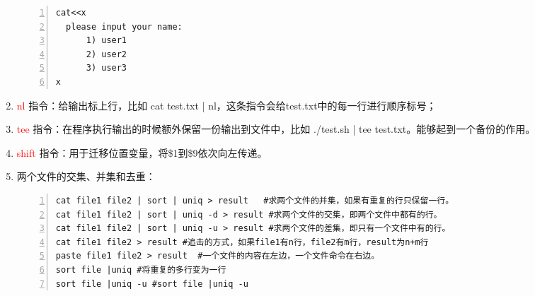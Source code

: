 \begin{enumerate}
    \begin{lstlisting}[language = shell, numbers=left, 
         numberstyle=\tiny,keywordstyle=\color{blue!70},
         commentstyle=\color{red!50!green!50!blue!50},frame=shadowbox,
         rulesepcolor=\color{red!20!green!20!blue!20},basicstyle=\ttfamily]
cat<<x
  please input your name:
      1) user1
      2) user2
      3) user3
x
    \end{lstlisting}
  \item \textcolor{red}{nl} 指令：给输出标上行，比如 cat test.txt | nl，这条指令会给test.txt中的每一行进行顺序标号；
  \item \textcolor{red}{tee} 指令：在程序执行输出的时候额外保留一份输出到文件中，比如 ./test.sh | tee test.txt。能够起到一个备份的作用。
  \item \textcolor{red}{shift} 指令：用于迁移位置变量，将\$1到\$9依次向左传递。
  \item 两个文件的交集、并集和去重：
    \begin{lstlisting}[language = shell, numbers=left, 
         numberstyle=\tiny,keywordstyle=\color{blue!70},
         commentstyle=\color{red!50!green!50!blue!50},frame=shadowbox,
         rulesepcolor=\color{red!20!green!20!blue!20},basicstyle=\ttfamily]
cat file1 file2 | sort | uniq > result   #求两个文件的并集，如果有重复的行只保留一行。 
cat file1 file2 | sort | uniq -d > result #求两个文件的交集，即两个文件中都有的行。
cat file1 file2 | sort | uniq -u > result #求两个文件的差集，即只有一个文件中有的行。
cat file1 file2 > result #追击的方式，如果file1有n行，file2有m行，result为n+m行
paste file1 file2 > result  #一个文件的内容在左边，一个文件命令在右边。
sort file |uniq #将重复的多行变为一行
sort file |uniq -u #sort file |uniq -u
    \end{lstlisting}
\end{enumerate}

